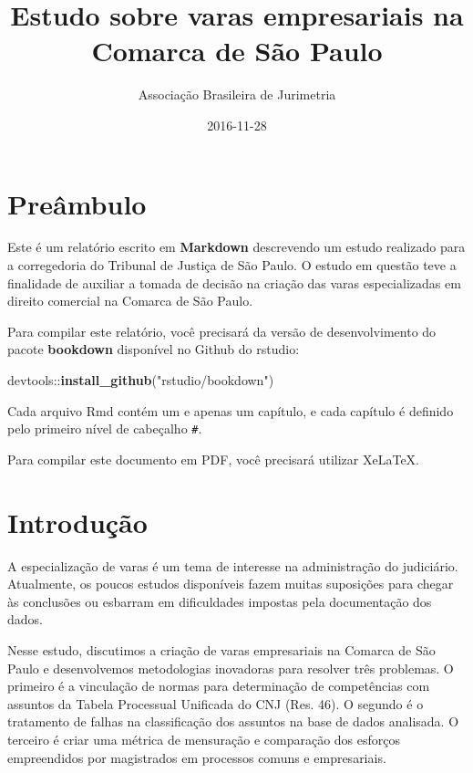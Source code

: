 \documentclass[]{book}
\title{Estudo sobre varas empresariais na Comarca de São Paulo}
\author{Associação Brasileira de Jurimetria}
\date{2016-11-28}
\newenvironment{Shaded}{\begin{snugshade}}{\end{snugshade}}
\newcommand{\KeywordTok}[1]{\textcolor[rgb]{0.13,0.29,0.53}{\textbf{{#1}}}}
\newcommand{\StringTok}[1]{\textcolor[rgb]{0.31,0.60,0.02}{{#1}}}
\newcommand{\NormalTok}[1]{{#1}}
\begin{document}
\maketitle

{
\setcounter{tocdepth}{1}
\tableofcontents
}
\chapter{Preâmbulo}\label{preambulo}

Este é um relatório escrito em \textbf{Markdown} descrevendo um estudo
realizado para a corregedoria do Tribunal de Justiça de São Paulo. O
estudo em questão teve a finalidade de auxiliar a tomada de decisão na
criação das varas especializadas em direito comercial na Comarca de São
Paulo.

Para compilar este relatório, você precisará da versão de
desenvolvimento do pacote \textbf{bookdown} disponível no Github do
rstudio:

\begin{Shaded}
\begin{Highlighting}[]
\NormalTok{devtools::}\KeywordTok{install_github}\NormalTok{(}\StringTok{"rstudio/bookdown"}\NormalTok{)}
\end{Highlighting}
\end{Shaded}

Cada arquivo Rmd contém um e apenas um capítulo, e cada capítulo é
definido pelo primeiro nível de cabeçalho \texttt{\#}.

Para compilar este documento em PDF, você precisará utilizar XeLaTeX.

\chapter{Introdução}\label{introducao}

A especialização de varas é um tema de interesse na administração do
judiciário. Atualmente, os poucos estudos disponíveis fazem muitas
suposições para chegar às conclusões ou esbarram em dificuldades
impostas pela documentação dos dados.

Nesse estudo, discutimos a criação de varas empresariais na Comarca de
São Paulo e desenvolvemos metodologias inovadoras para resolver três
problemas. O primeiro é a vinculação de normas para determinação de
competências com assuntos da Tabela Processual Unificada do CNJ (Res.
46). O segundo é o tratamento de falhas na classificação dos assuntos na
base de dados analisada. O terceiro é criar uma métrica de mensuração e
comparação dos esforços empreendidos por magistrados em processos comuns
e empresariais.
\end{document}
